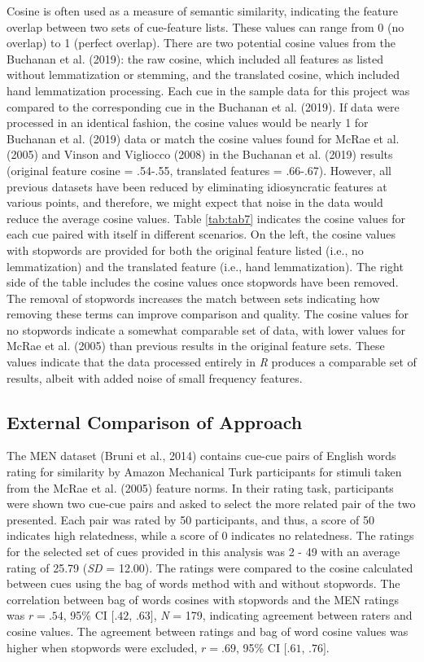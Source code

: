 \documentclass[man]{apa6}
\begin{document}
Cosine is often used as a measure of semantic similarity, indicating the feature overlap between two sets of cue-feature lists. These values can range from 0 (no overlap) to 1 (perfect overlap). There are two potential cosine values from the Buchanan et al. (2019): the raw cosine, which included all features as listed without lemmatization or stemming, and the translated cosine, which included hand lemmatization processing. Each cue in the sample data for this project was compared to the corresponding cue in the Buchanan et al. (2019). If data were processed in an identical fashion, the cosine values would be nearly 1 for Buchanan et al. (2019) data or match the cosine values found for McRae et al. (2005) and Vinson and Vigliocco (2008) in the Buchanan et al. (2019) results (original feature cosine = .54-.55, translated features = .66-.67). However, all previous datasets have been reduced by eliminating idiosyncratic features at various points, and therefore, we might expect that noise in the data would reduce the average cosine values. Table \ref{tab:tab7} indicates the cosine values for each cue paired with itself in different scenarios. On the left, the cosine values with stopwords are provided for both the original feature listed (i.e., no lemmatization) and the translated feature (i.e., hand lemmatization). The right side of the table includes the cosine values once stopwords have been removed. The removal of stopwords increases the match between sets indicating how removing these terms can improve comparison and quality. The cosine values for no stopwords indicate a somewhat comparable set of data, with lower values for McRae et al. (2005) than previous results in the original feature sets. These values indicate that the data processed entirely in \emph{R} produces a comparable set of results, albeit with added noise of small frequency features.

\hypertarget{external-comparison-of-approach}{%
\subsection{External Comparison of Approach}\label{external-comparison-of-approach}}

The MEN dataset (Bruni et al., 2014) contains cue-cue pairs of English words rating for similarity by Amazon Mechanical Turk participants for stimuli taken from the McRae et al. (2005) feature norms. In their rating task, participants were shown two cue-cue pairs and asked to select the more related pair of the two presented. Each pair was rated by 50 participants, and thus, a score of 50 indicates high relatedness, while a score of 0 indicates no relatedness. The ratings for the selected set of cues provided in this analysis was 2 - 49 with an average rating of 25.79 (\emph{SD} = 12.00). The ratings were compared to the cosine calculated between cues using the bag of words method with and without stopwords. The correlation between bag of words cosines with stopwords and the MEN ratings was \(r = .54\), 95\% CI \([.42\), \(.63]\), \emph{N} = 179, indicating agreement between raters and cosine values. The agreement between ratings and bag of word cosine values was higher when stopwords were excluded, \(r = .69\), 95\% CI \([.61\), \(.76]\).
\end{document}

